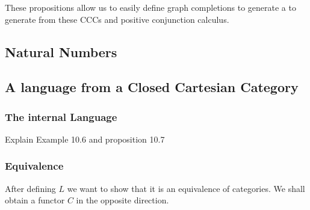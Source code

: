 These propositions allow us to easily define graph completions to generate a to generate from these CCCs and positive conjunction calculus.


\subsection{Natural Numbers}

\subsection{A language from a Closed Cartesian Category}
\subsubsection{The internal Language}
Explain Example 10.6 and proposition 10.7
\subsubsection{Equivalence}
After defining $L$ we want to show that it is an equivalence of categories. We shall obtain a functor $C$ in the opposite direction.  






